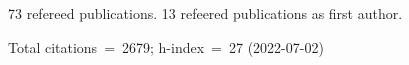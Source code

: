 73 refereed publications. 13 refeered publications as first author.

Total citations~=~2679; h-index~=~27 (2022-07-02)